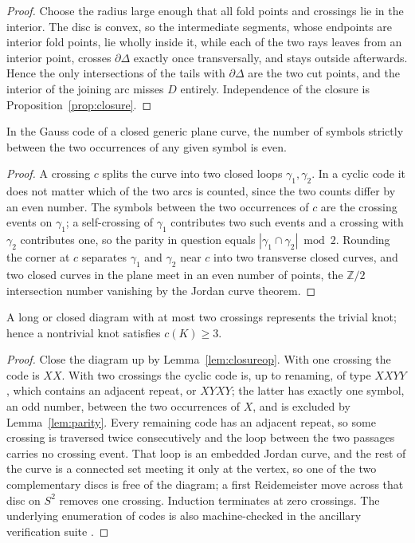 \begin{proof}
Choose the radius large enough that all fold points and crossings lie in the interior. The disc is convex, so the intermediate segments, whose endpoints are interior fold points, lie wholly inside it, while each of the two rays leaves from an interior point, crosses $\partial\Delta$ exactly once transversally, and stays outside afterwards. Hence the only intersections of the tails with $\partial\Delta$ are the two cut points, and the interior of the joining arc misses $D$ entirely. Independence of the closure is Proposition~\ref{prop:closure}.
\end{proof}

\begin{lemma}\label{lem:parity}
In the Gauss code of a closed generic plane curve, the number of symbols strictly between the two occurrences of any given symbol is even.
\end{lemma}

\begin{proof}
A crossing $c$ splits the curve into two closed loops $\gamma_1,\gamma_2$. In a cyclic code it does not matter which of the two arcs is counted, since the two counts differ by an even number. The symbols between the two occurrences of $c$ are the crossing events on $\gamma_1$; a self-crossing of $\gamma_1$ contributes two such events and a crossing with $\gamma_2$ contributes one, so the parity in question equals $|\gamma_1\cap\gamma_2|\bmod2$. Rounding the corner at $c$ separates $\gamma_1$ and $\gamma_2$ near $c$ into two transverse closed curves, and two closed curves in the plane meet in an even number of points, the $\mathbb Z/2$ intersection number vanishing by the Jordan curve theorem.
\end{proof}

\begin{lemma}\label{lem:twocrossings}
A long or closed diagram with at most two crossings represents the trivial knot; hence a nontrivial knot satisfies $c(K)\ge3$.
\end{lemma}

\begin{proof}
Close the diagram up by Lemma~\ref{lem:closureop}. With one crossing the code is $XX$. With two crossings the cyclic code is, up to renaming, of type $XXYY$, which contains an adjacent repeat, or $XYXY$; the latter has exactly one symbol, an odd number, between the two occurrences of $X$, and is excluded by Lemma~\ref{lem:parity}. Every remaining code has an adjacent repeat, so some crossing is traversed twice consecutively and the loop between the two passages carries no crossing event. That loop is an embedded Jordan curve, and the rest of the curve is a connected set meeting it only at the vertex, so one of the two complementary discs is free of the diagram; a first Reidemeister move across that disc on $S^2$ removes one crossing. Induction terminates at zero crossings. The underlying enumeration of codes is also machine-checked in the ancillary verification suite \cite{anc}.
\end{proof}

